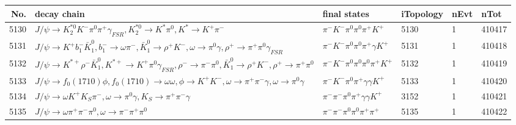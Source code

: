 \begin{table}[htbp] 
\begin{center}
\begin{small}
\begin{tabular}{rlllll}\hline\hline
 No. & decay chain & final states &  iTopology & nEvt & nTot \\\hline
5130&$J/\psi       \rightarrow K_2^{*0}       K^{-}          \pi^{0}        \pi^{+}        \gamma_{FSR} , K_2^{*0}        \rightarrow K^{*}          \pi^{0}        , K^{*}           \rightarrow K^{+}          \pi^{-}        $&$\pi^{-}        K^{-}          \pi^{0}        \pi^{0}        \pi^{+}        K^{+}          $& 5130&    1&410417\\
5131&$J/\psi       \rightarrow K^{+}          b_{1}^{-}      \bar{K}_1^{0} , b_{1}^{-}       \rightarrow \omega         \pi^{-}        , \bar{K}_1^{0}  \rightarrow \rho^{+}      K^{-}          , \omega          \rightarrow \pi^{0}        \gamma       , \rho^{+}       \rightarrow \pi^{+}        \pi^{0}        \gamma_{FSR} $&$\pi^{-}        K^{-}          \pi^{0}        \pi^{0}        \pi^{+}        \gamma       K^{+}          $& 5131&    1&410418\\
5132&$J/\psi       \rightarrow K^{*+}         \rho^{-}      \bar{K}_1^{0} , K^{*+}          \rightarrow K^{+}          \pi^{0}        \gamma_{FSR} , \rho^{-}       \rightarrow \pi^{-}        \pi^{0}        , \bar{K}_1^{0}  \rightarrow \rho^{+}      K^{-}          , \rho^{+}       \rightarrow \pi^{+}        \pi^{0}        $&$\pi^{-}        K^{-}          \pi^{0}        \pi^{0}        \pi^{0}        \pi^{+}        K^{+}          $& 5132&    1&410419\\
5133&$J/\psi       \rightarrow f_{0}(1710)    \phi           , f_{0}(1710)     \rightarrow \omega         \omega         , \phi            \rightarrow K^{+}          K^{-}          , \omega          \rightarrow \pi^{+}        \pi^{-}        \gamma       , \omega          \rightarrow \pi^{0}        \gamma       $&$\pi^{-}        K^{-}          \pi^{0}        \pi^{+}        \gamma       \gamma       K^{+}          $& 5133&    1&410420\\
5134&$J/\psi       \rightarrow \omega         K^{+}          K_{S}          \pi^{-}        , \omega          \rightarrow \pi^{0}        \gamma       , K_{S}           \rightarrow \pi^{+}        \pi^{-}        \gamma       $&$\pi^{-}        \pi^{-}        \pi^{0}        \pi^{+}        \gamma       \gamma       K^{+}          $& 3152&    1&410421\\
5135&$J/\psi       \rightarrow \omega         \pi^{+}        \pi^{-}        \pi^{0}        , \omega          \rightarrow \pi^{-}        \pi^{+}        \pi^{0}        $&$\pi^{-}        \pi^{-}        \pi^{0}        \pi^{0}        \pi^{+}        \pi^{+}        $& 5135&    1&410422\\

\end{tabular}
\end{small}
\end{center}
\end{table}
